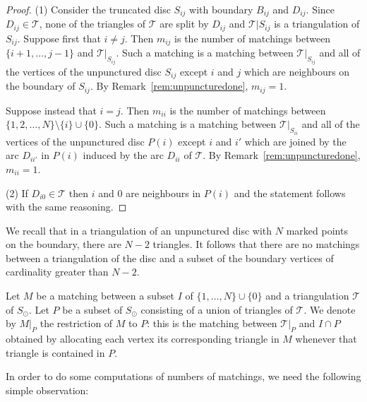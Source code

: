 \documentclass[a4paper]{amsart}
\begin{document}
\begin{proof}
(1) Consider the truncated disc $S_{ij}$ with boundary
$B_{ij}$ and $D_{ij}$. Since $D_{ij}\in{\mathcal T}$, none of the triangles
of ${\mathcal T}$ are split by $D_{ij}$ and ${\mathcal T}|S_{ij}$ is a triangulation
of $S_{ij}$. Suppose first that $i \neq j$.
Then $m_{ij}$ is the number of matchings between
$\{i+1,\dots,j-1\}$ and ${\mathcal T}|_{S_{ij}}$. Such a matching is
a matching between ${\mathcal T}|_{S_{ij}}$ and all of the vertices of
the unpunctured disc $S_{ij}$ except $i$ and $j$ which
are neighbours on the boundary of $S_{ij}$. By
Remark~\ref{rem:unpuncturedone}, $m_{ij}=1$.

Suppose instead that $i=j$.
Then $m_{ii}$ is the number of matchings between
$\{1,2,\ldots ,N\}\setminus \{i\}\cup \{0\}$.
Such a matching is a matching between ${\mathcal T}|_{S_{ii}}$ and all of
the vertices of the unpunctured disc $P(i)$ except
$i$ and $i'$ which are joined by the arc $D_{ii'}$ in $P(i)$
induced by the arc $D_{ii}$ of ${\mathcal T}$. By Remark~\ref{rem:unpuncturedone},
$m_{ii}=1$.

(2) If $D_{i0}\in{\mathcal T}$ then $i$ and $0$ are neighbours in
$P(i)$ and the statement follows with the same reasoning. 
\end{proof}

\begin{remark} \label{rem:counting}
We recall that in a triangulation of an unpunctured disc with $N$
marked points on the boundary, there are $N-2$ triangles. It follows that
there are no matchings between a triangulation of the disc and
a subset of the boundary vertices of cardinality greater than $N-2$.
\end{remark}

\begin{definition} 
Let $M$ be a matching between a subset $I$ of $\{1,\ldots ,N\}\cup \{0\}$
and a triangulation ${\mathcal T}$ of $S_{\odot}$. Let $P$ be a subset
of $S_{\odot}$ consisting of a union of triangles of ${\mathcal T}$.
We denote by $M|_P$ the restriction of $M$ to $P$: this is the
matching between ${\mathcal T}|_P$ and $I\cap P$ obtained by allocating each
vertex its corresponding triangle in $M$ whenever that triangle is
contained in $P$.
\end{definition}

In order to do some computations of numbers of matchings, we need the
following simple observation:
\end{document}
